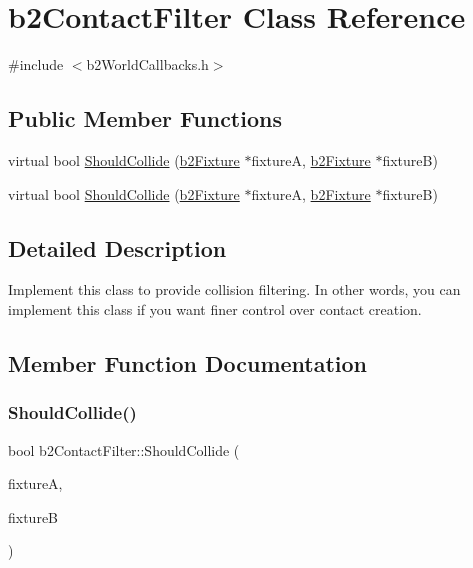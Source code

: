 \hypertarget{classb2ContactFilter}{}\section{b2\+Contact\+Filter Class Reference}
\label{classb2ContactFilter}


{\ttfamily \#include $<$b2\+World\+Callbacks.\+h$>$}

\subsection*{Public Member Functions}
\begin{DoxyCompactItemize}
\item 
virtual bool \hyperlink{classb2ContactFilter_aac8f6155d1f577d125db587f5269289b}{Should\+Collide} (\hyperlink{classb2Fixture}{b2\+Fixture} $\ast$fixtureA, \hyperlink{classb2Fixture}{b2\+Fixture} $\ast$fixtureB)
\item 
virtual bool \hyperlink{classb2ContactFilter_a0e33d4fc90a9345160a07cc494b45ecd}{Should\+Collide} (\hyperlink{classb2Fixture}{b2\+Fixture} $\ast$fixtureA, \hyperlink{classb2Fixture}{b2\+Fixture} $\ast$fixtureB)
\end{DoxyCompactItemize}


\subsection{Detailed Description}
Implement this class to provide collision filtering. In other words, you can implement this class if you want finer control over contact creation. 

\subsection{Member Function Documentation}
\mbox{\label{classb2ContactFilter_aac8f6155d1f577d125db587f5269289b}} 
\subsubsection{\texorpdfstring{Should\+Collide()}{ShouldCollide()}\hspace{0.1cm}{\footnotesize\ttfamily [1/2]}}
{\footnotesize\ttfamily bool b2\+Contact\+Filter\+::\+Should\+Collide (\begin{DoxyParamCaption}\item[{\hyperlink{classb2Fixture}{b2\+Fixture} $\ast$}]{fixtureA,  }\item[{\hyperlink{classb2Fixture}{b2\+Fixture} $\ast$}]{fixtureB }\end{DoxyParamCaption})\hspace{0.3cm}{\ttfamily [virtual]}}

